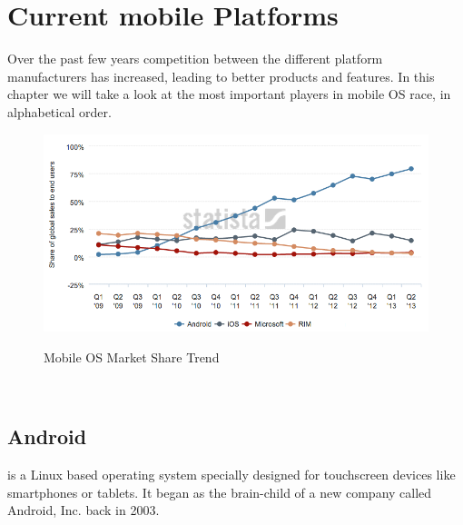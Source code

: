 \chapter{Current mobile Platforms}\label{ch:m_plats} %
Over the past few years competition between the different platform manufacturers has increased, leading to better products and features. In this chapter we will take a look at the most important players in mobile OS race, in alphabetical order.

\begin{figure}[H]
    \begin{center}
        {\includegraphics[width=1\linewidth]{gfx/statista-mobile}}
        \caption[Mobile OS Market Share Trend]{Mobile OS Market Share Trend\footnotemark}\label{fig:trend}
    \end{center}
\end{figure}
\\

\section{Android}
 is a Linux based operating system specially designed for touchscreen devices like smartphones or tablets. It began as the brain-child of a new company called Android, Inc. back in 2003.

